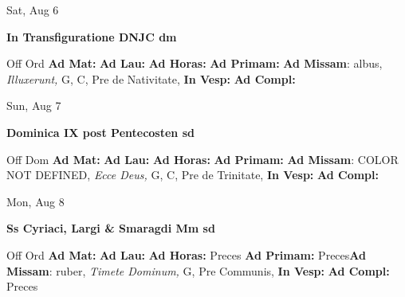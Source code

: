 \documentclass[10pt]{memoir}
\begin{document}
\begin{center}
\begin{minipage}{3.5in}
\vspace{2em}
\begin{center}Sat, Aug 6
\end{center}
\textbf{ \large In Transfiguratione DNJC
\textnormal{\normalsize dm}}

\begin{justify}Off Ord
\textbf{Ad Mat: }
\textbf{Ad Lau: }
\textbf{Ad Horas: }
\textbf{Ad Primam: }\textbf{Ad Missam}: albus, \textit{Illuxerunt,} G, C, Pre de Nativitate, 
\textbf{In Vesp: }
\textbf{Ad Compl: }
\end{justify}
\end{minipage}
\end{center}

\begin{center}
\begin{minipage}{3.5in}
\vspace{2em}
\begin{center}Sun, Aug 7
\end{center}
\textbf{ \large Dominica IX post Pentecosten
\textnormal{\normalsize sd}}

\begin{justify}Off Dom
\textbf{Ad Mat: }
\textbf{Ad Lau: }
\textbf{Ad Horas: }
\textbf{Ad Primam: }\textbf{Ad Missam}: COLOR NOT DEFINED, \textit{Ecce Deus,} G, C, Pre de Trinitate, 
\textbf{In Vesp: }
\textbf{Ad Compl: }
\end{justify}
\end{minipage}
\end{center}

\begin{center}
\begin{minipage}{3.5in}
\vspace{2em}
\begin{center}Mon, Aug 8
\end{center}
\textbf{ \large Ss Cyriaci, Largi \& Smaragdi Mm
\textnormal{\normalsize sd}}

\begin{justify}Off Ord
\textbf{Ad Mat: }
\textbf{Ad Lau: }
\textbf{Ad Horas: }Preces
\textbf{Ad Primam: }Preces\textbf{Ad Missam}: ruber, \textit{Timete Dominum,} G, Pre Communis, 
\textbf{In Vesp: }
\textbf{Ad Compl: }Preces
\end{justify}
\end{minipage}
\end{center}
\end{document}
